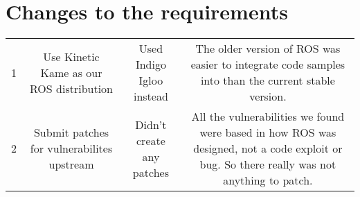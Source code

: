 \documentclass[IEEEtran,letterpaper,10pt,notitlepage,draftclsnofoot,onecolumn]{article}
\begin{document}
\section{Changes to the requirements}
\begin{center}
\begin{tabular}{ |c|c|c|c| } 
 \hline
 1 & Use Kinetic Kame as our ROS distribution & Used Indigo Igloo instead & The older version of ROS was easier to integrate code samples into than the current stable version.\\ 
 2 & Submit patches for vulnerabilites upstream & Didn't create any patches & All the vulnerabilities we found were based in how ROS was designed, not a code exploit or bug. So there really was not anything to patch.\\ 
 \hline
\end{tabular}
\end{center}

%
\end{document}
